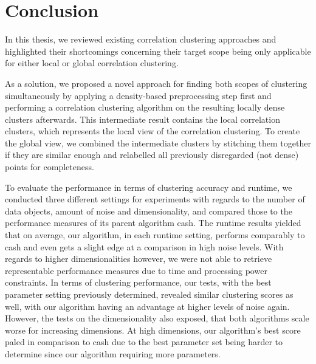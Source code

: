 \chapter{Conclusion}\label{ch:conclusion}
In this thesis, we reviewed existing correlation clustering approaches and highlighted their shortcomings concerning their target scope being only applicable for either local or global correlation clustering. 

As a solution, we proposed a novel approach for finding both scopes of clustering simultaneously by applying a density-based preprocessing step first and performing a correlation clustering algorithm on the resulting locally dense clusters afterwards. This intermediate result contains the local correlation clusters, which represents the local view of the correlation clustering. To create the global view, we combined the intermediate clusters by stitching them together if they are similar enough and relabelled all previously disregarded (not dense) points for completeness.

To evaluate the performance in terms of clustering accuracy and runtime, we conducted three different settings for experiments with regards to the number of data objects, amount of noise and dimensionality, and compared those to the performance measures of its parent algorithm \gls{cash}. 
The runtime results yielded that on average, our algorithm, in each runtime setting, performs comparably to \gls{cash} and even gets a slight edge at a comparison in high noise levels. With regards to higher dimensionalities however, we were not able to retrieve representable performance measures due to time and processing power constraints. In terms of clustering performance, our tests, with the best parameter setting previously determined, revealed similar clustering scores as well, with our algorithm having an advantage at higher levels of noise again. However, the tests on the dimensionality also exposed, that both algorithms scale worse for increasing dimensions. At high dimensions, our algorithm's best score paled in comparison to \gls{cash} due to the best parameter set being harder to determine since our algorithm requiring more parameters.


